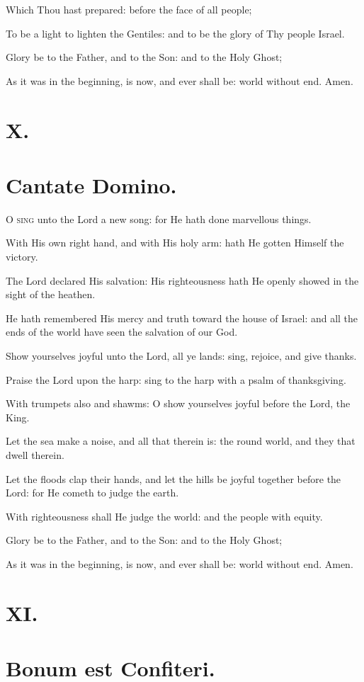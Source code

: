 Which Thou hast prepared: before the face of all people;

To be a light to lighten the Gentiles: and to be the glory of Thy people Israel.

Glory be to the Father, and to the Son: and to the Holy Ghost;

As it was in the beginning, is now, and ever shall be: world without end. Amen.

\section*{X.}
\section*{Cantate Domino.}

\lettrine{O}{ sing} unto the Lord a new song: for He hath done marvellous things.

With His own right hand, and with His holy arm: hath He gotten Himself the victory.

The Lord declared His salvation: His righteousness hath He openly showed in the sight of the heathen.

He hath remembered His mercy and truth toward the house of Israel: and all the ends of the world have seen the salvation of our God.

Show yourselves joyful unto the Lord, all ye lands: sing, rejoice, and give thanks.

Praise the Lord upon the harp: sing to the harp with a psalm of thanksgiving.

With trumpets also and shawms: O show yourselves joyful before the Lord, the King.

Let the sea make a noise, and all that therein is: the round world, and they that dwell therein.

Let the floods clap their hands, and let the hills be joyful together before the Lord: for He cometh to judge the earth.

With righteousness shall He judge the world: and the people with equity.

Glory be to the Father, and to the Son: and to the Holy Ghost;

As it was in the beginning, is now, and ever shall be: world without end. Amen. 

\section*{XI.}
\section*{Bonum est Confiteri.}

